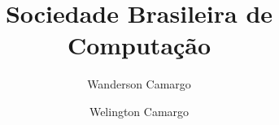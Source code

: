 \documentclass{article}
\title{Sociedade Brasileira de Computação}
\author{Wanderson Camargo\and{}Welington Camargo}
\begin{document}
\maketitle{}
\end{document}
